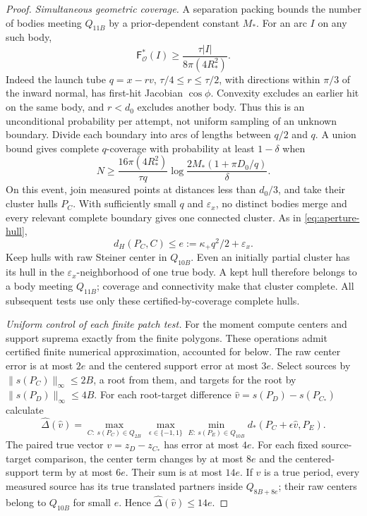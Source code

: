 \begin{proof}
\emph{Simultaneous geometric coverage.}
A separation packing bounds the number of bodies meeting $Q_{11B}$
by a prior-dependent constant $M_*$. For an arc $I$ on any such body,
\[
 \mathsf F^*_{\mathcal O}(I)\ge
                 \frac{\tau|I|}{8\pi(4R_*^2)}.
\]
Indeed the launch tube $q=x-rv$, $\tau/4\le r\le\tau/2$, with directions
within $\pi/3$ of the inward normal, has first-hit Jacobian $\cos\phi$.
Convexity excludes an earlier hit on the same body, and $r<d_0$
excludes another body. Thus this is an unconditional probability per
attempt, not uniform sampling of an unknown boundary. Divide each
boundary into arcs of lengths between $q/2$ and $q$. A union bound gives
complete $q$-coverage with probability at least $1-\delta$ when
\begin{equation}\label{eq:repeatcoupon}
 N\ge\frac{16\pi(4R_*^2)}{\tau q}
             \log\frac{2M_*(1+\pi D_0/q)}{\delta}.
\end{equation}
On this event, join measured points at distances less than $d_0/3$,
and take their cluster hulls $P_C$. With sufficiently small $q$ and
$\varepsilon_x$, no distinct bodies merge and every relevant complete
boundary gives one connected cluster. As in \eqref{eq:aperture-hull},
\begin{equation}\label{eq:repeathull}
         d_H(P_C,C)\le e:=\kappa_+q^2/2+\varepsilon_x.
\end{equation}
Keep hulls with raw Steiner center in $Q_{10B}$. Even an initially
partial cluster has its hull in the $\varepsilon_x$-neighborhood of one
true body. A kept hull therefore belongs to a body meeting $Q_{11B}$;
coverage and connectivity make that cluster complete. All subsequent
tests use only these certified-by-coverage complete hulls.

\emph{Uniform control of each finite patch test.}
For the moment compute centers and support suprema exactly from the
finite polygons. These operations admit certified finite numerical
approximation, accounted for below. The raw center error is at most
$2e$ and the centered support error at most $3e$. Select sources by
$\|s(P_C)\|_\infty\le2B$, a root from them, and targets for the root by
$\|s(P_D)\|_\infty\le4B$. For each root-target difference
$\widehat v=s(P_D)-s(P_{C_*})$ calculate
\begin{equation}\label{eq:repeatmeasured}
 \widehat\Delta(\widehat v)=
 \max_{C:\ s(P_C)\in Q_{2B}}\ \max_{\epsilon\in\{-1,1\}}
   \min_{E:\ s(P_E)\in Q_{10B}}d_*(P_C+\epsilon\widehat v,P_E).
\end{equation}
The paired true vector $v=z_D-z_{C_*}$ has error at most $4e$.
For each fixed source-target comparison, the center term changes by
at most $8e$ and the centered-support term by at most $6e$.
Their sum is at most $14e$. If $v$ is a true period, every measured
source has its true translated partners inside $Q_{8B+8e}$; their raw
centers belong to $Q_{10B}$ for small $e$. Hence
$\widehat\Delta(\widehat v)\le14e$.


\end{proof}
